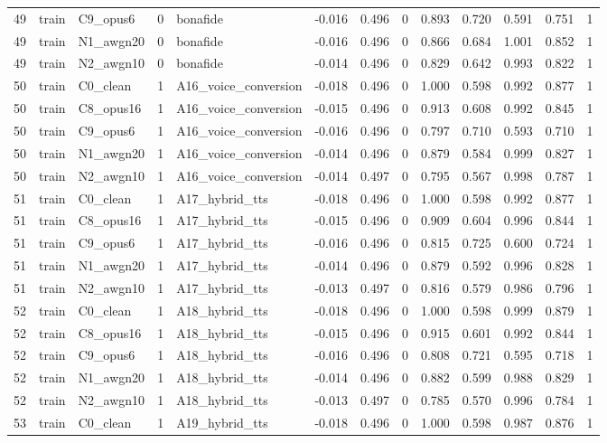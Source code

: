 \begin{tabular}{rllrlrrrrrrrr}
49 & train & C9_opus6 & 0 & bonafide & -0.016 & 0.496 & 0 & 0.893 & 0.720 & 0.591 & 0.751 & 1 \\
49 & train & N1_awgn20 & 0 & bonafide & -0.016 & 0.496 & 0 & 0.866 & 0.684 & 1.001 & 0.852 & 1 \\
49 & train & N2_awgn10 & 0 & bonafide & -0.014 & 0.496 & 0 & 0.829 & 0.642 & 0.993 & 0.822 & 1 \\
50 & train & C0_clean & 1 & A16_voice_conversion & -0.018 & 0.496 & 0 & 1.000 & 0.598 & 0.992 & 0.877 & 1 \\
50 & train & C8_opus16 & 1 & A16_voice_conversion & -0.015 & 0.496 & 0 & 0.913 & 0.608 & 0.992 & 0.845 & 1 \\
50 & train & C9_opus6 & 1 & A16_voice_conversion & -0.016 & 0.496 & 0 & 0.797 & 0.710 & 0.593 & 0.710 & 1 \\
50 & train & N1_awgn20 & 1 & A16_voice_conversion & -0.014 & 0.496 & 0 & 0.879 & 0.584 & 0.999 & 0.827 & 1 \\
50 & train & N2_awgn10 & 1 & A16_voice_conversion & -0.014 & 0.497 & 0 & 0.795 & 0.567 & 0.998 & 0.787 & 1 \\
51 & train & C0_clean & 1 & A17_hybrid_tts & -0.018 & 0.496 & 0 & 1.000 & 0.598 & 0.992 & 0.877 & 1 \\
51 & train & C8_opus16 & 1 & A17_hybrid_tts & -0.015 & 0.496 & 0 & 0.909 & 0.604 & 0.996 & 0.844 & 1 \\
51 & train & C9_opus6 & 1 & A17_hybrid_tts & -0.016 & 0.496 & 0 & 0.815 & 0.725 & 0.600 & 0.724 & 1 \\
51 & train & N1_awgn20 & 1 & A17_hybrid_tts & -0.014 & 0.496 & 0 & 0.879 & 0.592 & 0.996 & 0.828 & 1 \\
51 & train & N2_awgn10 & 1 & A17_hybrid_tts & -0.013 & 0.497 & 0 & 0.816 & 0.579 & 0.986 & 0.796 & 1 \\
52 & train & C0_clean & 1 & A18_hybrid_tts & -0.018 & 0.496 & 0 & 1.000 & 0.598 & 0.999 & 0.879 & 1 \\
52 & train & C8_opus16 & 1 & A18_hybrid_tts & -0.015 & 0.496 & 0 & 0.915 & 0.601 & 0.992 & 0.844 & 1 \\
52 & train & C9_opus6 & 1 & A18_hybrid_tts & -0.016 & 0.496 & 0 & 0.808 & 0.721 & 0.595 & 0.718 & 1 \\
52 & train & N1_awgn20 & 1 & A18_hybrid_tts & -0.014 & 0.496 & 0 & 0.882 & 0.599 & 0.988 & 0.829 & 1 \\
52 & train & N2_awgn10 & 1 & A18_hybrid_tts & -0.013 & 0.497 & 0 & 0.785 & 0.570 & 0.996 & 0.784 & 1 \\
53 & train & C0_clean & 1 & A19_hybrid_tts & -0.018 & 0.496 & 0 & 1.000 & 0.598 & 0.987 & 0.876 & 1 \\

\end{tabular}
